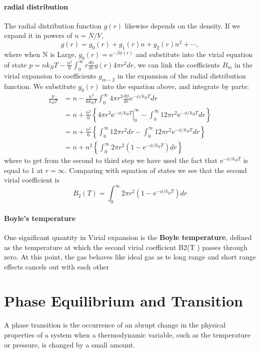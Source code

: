 \documentclass[12pt,a4paper]{article}
\begin{document}
\paragraph*{radial distribution}
The radial distribution function $g(r)$ likewise depends on the density. If we expand it in powers of $n=N / V$,
$$
g(r)=g_0(r)+g_1(r) n+g_2(r) n^2+\cdots,
$$
where when N is Large, $g_0(r)=\mathrm{e}^{-\beta \phi(r)}$
and substitute into the virial equation of state 
$p=n k_B T-\frac{n^2}{6} \int_0^{\infty} r \frac{d \phi}{d r} g(r) 4 \pi r^2 d r$, we can link the coefficients $B_m$ in the virial expansion to coefficients $g_{m-2}$ in the expansion of the radial distribution function.
We substitute $g_0(r)$ into the equation above, and integrate by parts:
$$
\begin{aligned}
\frac{p}{k_B T} & =n-\frac{n^2}{6 k_B T} \int_0^{\infty} 4 \pi r^3 \frac{d \phi}{d r} \mathrm{e}^{-\phi / k_B T} d r \\
& =n+\frac{n^2}{6}\left\{\left.4 \pi r^3 \mathrm{e}^{-\phi / k_B T}\right|_0 ^{\infty}-\int_0^{\infty} 12 \pi r^2 \mathrm{e}^{-\phi / k_B T} d r\right\} \\
& =n+\frac{n^2}{6}\left\{\int_0^{\infty} 12 \pi r^2 d r-\int_0^{\infty} 12 \pi r^2 \mathrm{e}^{-\phi / k_B T} d r\right\} \\
& =n+n^2\left\{\int_0^{\infty} 2 \pi r^2\left(1-\mathrm{e}^{-\phi / k_B T}\right) d r\right\}
\end{aligned}
$$
where to get from the second to third step we have used the fact that $\mathrm{e}^{-\phi / k_B T}$ is equal to 1 at $r=\infty$. Comparing with equation of states we see that the second virial coefficient is
$$
B_2(T)=\int_0^{\infty} 2 \pi r^2\left(1-\mathrm{e}^{-\phi / k_B T}\right) d r
$$
\paragraph{Boyle's temperature}
One significant quantity in Virial expansion is the \textbf{Boyle temperature}, defined as the temperature at which the second virial coefficient B2(T ) passes through zero.
At this point, the gas behaves like ideal gas as te long range and short range effects cancels out with each other 

\section{Phase Equilibrium and Transition}
A phase transition is the occurrence of an abrupt change in the physical properties of a system when a thermodynamic variable, such as the temperature or pressure, is changed by a small amount.
\end{document}
